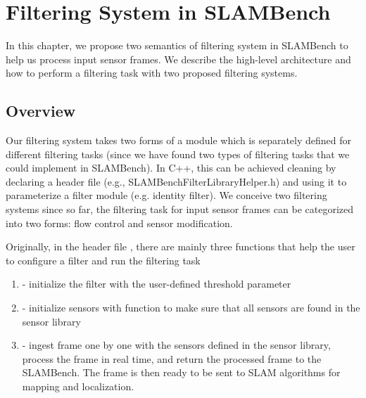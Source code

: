 
\chapter{Filtering System in SLAMBench} %

\label{Chapter3} %

In this chapter, we propose two semantics of filtering system in SLAMBench to help us process input sensor frames. 
We describe the high-level architecture and how to perform a filtering task with two proposed filtering systems.


\section{Overview}

Our filtering system takes two forms of a module which is separately defined for different filtering tasks (since we have found two types of filtering tasks that we could implement in SLAMBench). 
In C++, this can be achieved cleaning by declaring a header file (e.g., SLAMBenchFilterLibraryHelper.h) and using it to parameterize a filter module (e.g. identity filter).  
We conceive two filtering systems since so far, the filtering task for input sensor frames can be categorized into two forms: flow control and sensor modification. 

Originally, in the header file , there are mainly three functions that help the user to configure a filter and run the filtering task

\begin{enumerate}
	\item {} -  initialize the filter with the user-defined threshold parameter
	\item {} -  initialize sensors with  function to make sure that all sensors are found in the sensor library
	\item {} - ingest frame one by one with the sensors defined in the sensor library, process the frame in real time, and return the processed frame to the SLAMBench. 
	The frame is then ready to be sent to SLAM algorithms for mapping and localization. 
\end{enumerate}

